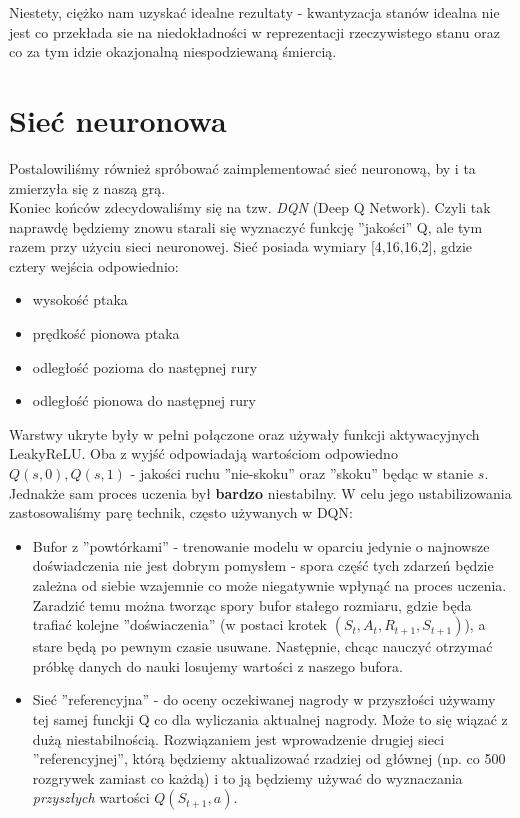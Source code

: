 \documentclass[12pt, A4]{article}
\begin{document}
\begin{itemize}
\begin{itemize}
	Niestety, ciężko nam uzyskać idealne rezultaty - kwantyzacja stanów idealna nie jest co przekłada sie na niedokładności w reprezentacji rzeczywistego stanu oraz co za tym idzie okazjonalną niespodziewaną śmiercią.


\section{Sieć neuronowa}
Postalowiliśmy również spróbować zaimplementować sieć neuronową, by i ta zmierzyła się z naszą grą. \\
	Koniec końców zdecydowaliśmy się na tzw. \textit{DQN} (Deep Q Network). Czyli tak naprawdę będziemy znowu starali się wyznaczyć funkcję ''jakości'' Q, ale tym razem przy użyciu sieci neuronowej.
	Sieć posiada wymiary [4,16,16,2], gdzie cztery wejścia odpowiednio:
	\begin{itemize}
	\item wysokość ptaka
	\item prędkość pionowa ptaka
	\item odległość pozioma do następnej rury
	\item odległość pionowa do następnej rury
	\end{itemize}
	Warstwy ukryte były w pełni połączone oraz używały funkcji aktywacyjnych LeakyReLU. Oba z wyjść odpowiadają wartościom odpowiedno $Q(s, 0), Q(s, 1)$ - jakości ruchu ''nie-skoku'' oraz ''skoku'' będąc w stanie $s$. \\
	Jednakże sam proces uczenia był \textbf{bardzo} niestabilny. W celu jego ustabilizowania zastosowaliśmy parę technik, często używanych w DQN:
	\begin{itemize}
	\item Bufor z ''powtórkami'' - trenowanie modelu w oparciu jedynie o najnowsze doświadczenia nie jest dobrym pomysłem - spora część tych zdarzeń będzie zależna od siebie wzajemnie co może niegatywnie wpłynąć na proces uczenia. Zaradzić temu można tworząc spory bufor stałego rozmiaru, gdzie będa trafiać kolejne ''doświaczenia'' (w postaci krotek $(S_t, A_t, R_{t+1}, S_{t+1})$), a stare będą po pewnym czasie usuwane. Następnie, chcąc nauczyć otrzymać próbkę danych do nauki losujemy wartości z naszego bufora.
	\item Sieć ''referencyjna'' - do oceny oczekiwanej nagrody w przyszłości używamy tej samej funckji Q co dla wyliczania aktualnej nagrody. Może to się wiązać z dużą niestabilnością. Rozwiązaniem jest wprowadzenie drugiej sieci ''referencyjnej'', którą będziemy aktualizować rzadziej od głównej (np. co 500 rozgrywek zamiast co każdą) i to ją będziemy używać do wyznaczania \textit{przyszłych} wartości $Q(S_{t+1}, a)$.  

\end{itemize}
\end{itemize}
\end{itemize}
\end{document}
